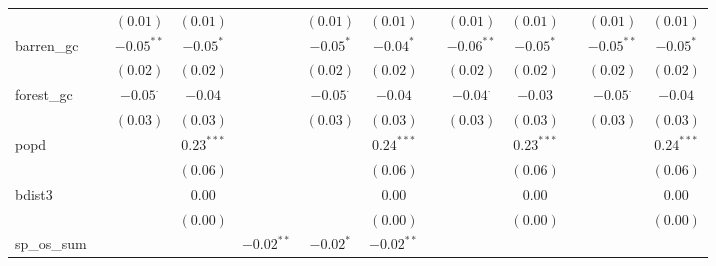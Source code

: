 \begin{sidewaystable}
\begin{center}
{\begin{tabular}{l c c c c c c c c c c c c}
                    &               & $(0.01)$        & $(0.01)$        &               & $(0.01)$        & $(0.01)$        &                 & $(0.01)$        & $(0.01)$        &                 & $(0.01)$        & $(0.01)$        \\
barren\_gc          &               & $-0.05^{**}$    & $-0.05^{*}$     &               & $-0.05^{*}$     & $-0.04^{*}$     &                 & $-0.06^{**}$    & $-0.05^{*}$     &                 & $-0.05^{**}$    & $-0.05^{*}$     \\
                    &               & $(0.02)$        & $(0.02)$        &               & $(0.02)$        & $(0.02)$        &                 & $(0.02)$        & $(0.02)$        &                 & $(0.02)$        & $(0.02)$        \\
forest\_gc          &               & $-0.05^{\cdot}$ & $-0.04$         &               & $-0.05^{\cdot}$ & $-0.04$         &                 & $-0.04^{\cdot}$ & $-0.03$         &                 & $-0.05^{\cdot}$ & $-0.04$         \\
                    &               & $(0.03)$        & $(0.03)$        &               & $(0.03)$        & $(0.03)$        &                 & $(0.03)$        & $(0.03)$        &                 & $(0.03)$        & $(0.03)$        \\
popd                &               &                 & $0.23^{***}$    &               &                 & $0.24^{***}$    &                 &                 & $0.23^{***}$    &                 &                 & $0.24^{***}$    \\
                    &               &                 & $(0.06)$        &               &                 & $(0.06)$        &                 &                 & $(0.06)$        &                 &                 & $(0.06)$        \\
bdist3              &               &                 & $0.00$          &               &                 & $0.00$          &                 &                 & $0.00$          &                 &                 & $0.00$          \\
                    &               &                 & $(0.00)$        &               &                 & $(0.00)$        &                 &                 & $(0.00)$        &                 &                 & $(0.00)$        \\
sp\_os\_sum         &               &                 &                 & $-0.02^{**}$  & $-0.02^{*}$     & $-0.02^{**}$    &                 &                 &                 &                 &                 &                 \\

\end{tabular}}
\end{center}
\end{sidewaystable}
